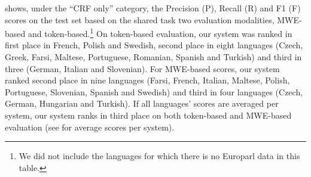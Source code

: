 \documentclass[output=paper
,modfonts
,nonflat]{langsci/langscibook}
\begin{document}
 shows, under the ``CRF only'' category, the Precision (P), Recall (R) and F1 (F) scores on the test set based on the shared task two evaluation modalities, MWE-based and token-based.\footnote{We did not include the languages for which there is no
  Europarl data in this table.} On token-based evaluation, our system was ranked in first place in French, Polish and Swedish, second place in eight languages (Czech, Greek, Farsi, Maltese, Portuguese, Romanian, Spanish and Turkish) and third in three (German, Italian and Slovenian). For MWE-based scores, our system ranked second place in nine languages (Farsi, French, Italian, Maltese, Polish, Portuguese, Slovenian, Spanish and Swedish) and third in four languages (Czech, German, Hungarian and Turkish). If all languages' scores are averaged per system, our system ranks in third place on both token-based and MWE-based evaluation (see  for average scores per system).
\end{document}
